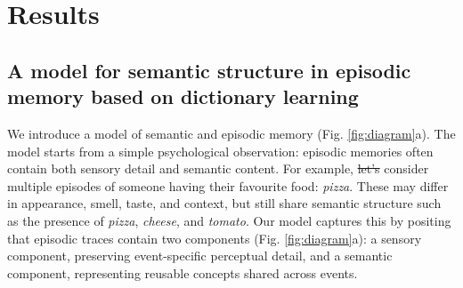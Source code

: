 \documentclass{article}
\providecommand{\DIFdeltex}[1]{{\protect\color{red}\sout{#1}}}                      %
\providecommand{\DIFdelbegin}{} %
\providecommand{\DIFdelend}{} %
\providecommand{\DIFdel}[1]{\texorpdfstring{\DIFdeltex{#1}}{}} %
\begin{document}
\section*{Results}
\subsection*{A model for semantic structure in episodic memory based on dictionary learning}
We introduce a model of semantic and episodic memory (Fig. \ref{fig:diagram}a). The model starts from a simple psychological observation: episodic memories often contain both sensory detail and semantic content. For example, \DIFdelbegin \DIFdel{let's }\DIFdelend consider multiple episodes of someone having their favourite food: \textit{pizza}. These may differ in appearance, smell, taste, and context, but still share semantic structure such as the presence of \textit{pizza}, \textit{cheese}, and \textit{tomato}. Our model captures this by positing that episodic traces contain two components (Fig. \ref{fig:diagram}a): a sensory component, preserving event-specific perceptual detail, and a semantic component, representing reusable concepts shared across events.
\newline\newline
\end{document}
